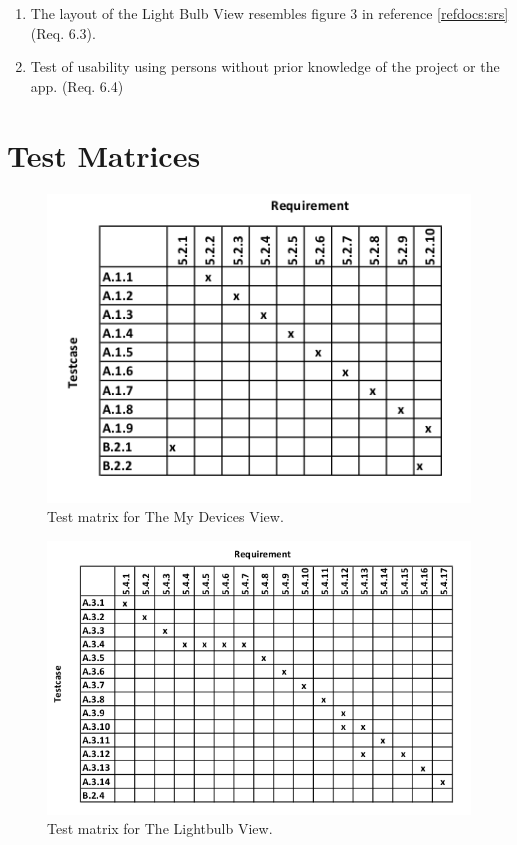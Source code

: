 \documentclass[a4paper]{article}
\newlength{\testlabellength}
\newenvironment{testlist}{\begin{enumerate}[label=\bfseries Test \thesubsection.\arabic* , labelindent=0pt, labelwidth=\testlabellength , leftmargin=2cm]}{\end{enumerate}}
\begin{document}
\begin{appendices}
\begin{testlist}
	\item The layout of the Light Bulb View resembles figure 3 in reference \ref{refdocs:srs} (Req. 6.3).
	
	\item Test of usability using persons without prior knowledge of the project or the app. (Req. 6.4)
\end{testlist}

\clearpage
\section{Test Matrices}
\begin{figure}[H]
    \centering
    \includegraphics[scale=0.9]{SVVS-pics/testmatrixMyDevices.png}
    \caption{Test matrix for The My Devices View.}
    \label{fig:testmatrix-mydevices}
\end{figure}

\begin{figure}[H]
    \centering
    \includegraphics[scale=0.9]{SVVS-pics/testmatrixLightbulb.png}
    \caption{Test matrix for The Lightbulb View.}
    \label{fig:testmatrix-lightbulb}
\end{figure}


\end{appendices}
\end{document}
